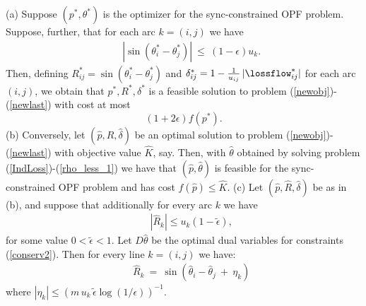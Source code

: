 \begin{LE}  (a) Suppose $(p^*, \theta^*)$ is the optimizer for the sync-constrained OPF problem. Suppose, further, that for each arc $k = (i,j)$ we have
\begin{eqnarray}
&& | \sin(\theta^*_i - \theta^*_j) | \ \le \ (1 - \epsilon) u_k.
 \end{eqnarray}
Then, defining $R^*_{ij} = \sin(\theta^*_i - \theta^*_j)$
and $\delta^*_{ij} = 1 - \frac{1}{u_{ij}} \, |\lossflow^*_{ij}|$ for each arc
$(i,j)$, we obtain that $p^*, R^*, \delta^*$ is a feasible solution to problem
(\ref{newobj})-(\ref{newlast}) with cost at most
$$ (1 + 2 \epsilon) f(p^*).$$
(b) Conversely, let $(\hat p, \hat R, \hat \delta)$ be an optimal solution to problem (\ref{newobj})-(\ref{newlast}) with objective value $\hat K$, say. Then, with $\hat \theta$ obtained by solving problem (\ref{IndLoss})-(\ref{rho_less_1}) we have that $(\hat p, \hat \theta)$ is feasible for the sync-constrained OPF problem and has cost $f(\hat p) \le \hat K$. (c) Let $(\hat p, \hat R, \hat \delta)$ be as in (b), and suppose that additionally for every arc $k$ we have
\begin{eqnarray}
&& |\hat R_k| \le u_k (1 - \tilde \epsilon), 
\end{eqnarray}
for some value $0 < \tilde \epsilon < 1$.  Let $D \hat \theta$ be the optimal dual variables for constraints (\ref{conserv2}).  Then for every line $k = (i,j)$ we have:
\begin{eqnarray}
&& \hat R_k \ = \ \sin(\hat \theta_i - \hat \theta_j \ + \ \eta_k) 
\end{eqnarray}
where $ | \eta_k | \le (m \, u_k \, \tilde \epsilon \log (1/\epsilon) )^{-1}$.
\end{LE} 